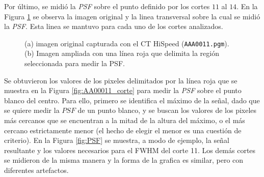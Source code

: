 \documentclass[11pt, twocolumn]{article}
\begin{document}
Por último, se midió la \textit{PSF} sobre el punto definido por los cortes $11$ al $14$. En la Figura \ref{fig:figuras_ej_7_b} se observa la imagen original y la linea transversal sobre la cual se midió la \textit{PSF}. Esta linea se mantuvo para cada uno de los cortes analizados. 

\begin{figure}[htbp]
  \centering
  \hfill
  \hfill
  \caption{(a) imagen original capturada con el CT HiSpeed (\texttt{AAA0011.pgm}). (b) Imagen ampliada con una línea roja que delimita la región seleccionada para medir la PSF.}
  \label{fig:figuras_ej_7_b}
\end{figure}

Se obtuvieron los valores de los pixeles delimitados por la línea roja que se muestra en la Figura \ref{fig:AA00011_corte} para medir la \textit{PSF} sobre el punto blanco del centro. Para ello, primero se identifica el máximo de la señal, dado que se quiere medir la $PSF$ de un punto blanco, y se buscan los valores de los pixeles más cercanos que se encuentran a la mitad de la altura del máximo, o el más cercano estrictamente menor (el hecho de elegir el menor es una cuestión de criterio). En la Figura \ref{fig:PSF} se muestra, a modo de ejemplo, la señal resultante y los valores necesarios para el FWHM del corte 11. Los demás cortes se midieron de la misma manera y la forma de la grafica es similar, pero con diferentes artefactos.
\end{document}
